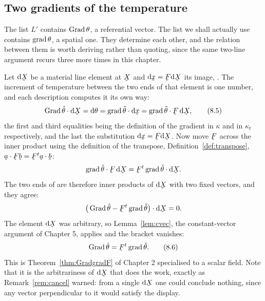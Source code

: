 \subsection*{Two gradients of the temperature}

The list $L'$ contains $\operatorname{Grad}\theta$, a referential vector. The list we
shall actually use contains $\operatorname{grad}\theta$, a spatial one. They determine
each other, and the relation between them is worth deriving rather than
quoting, since the same two-line argument recurs three more times in
this chapter.

Let $\dl\bX$ be a material line element at $\bX$ and $\dl\bx=\bF\dl\bX$
its image, . The increment of temperature between the two ends
of that element is one number, and each description computes it its own
way:
\begin{equation}
   \ip{\Grad\hat\theta}{\dl\bX}=\dl\theta
   =\ip{\grad\tilde\theta}{\dl\bx}
   =\ip{\grad\tilde\theta}{\bF\,\dl\bX},
   \tag{8.5}\label{eq:8.5}
\end{equation}
the first and third equalities being the definition of the gradient in
$\kappa$ and in $\kappa_{t}$ respectively, and the last the substitution
$\dl\bx=\bF\dl\bX$. Now move $\bF$ across the inner product using the
definition of the transpose, Definition~\ref{def:transpose},
$\ip\ba{\bF\bb}=\ip{\bF^{t}\ba}\bb$:
\[
   \ip{\grad\tilde\theta}{\bF\,\dl\bX}
   =\ip{\bF^{t}\grad\tilde\theta}{\dl\bX}.
\]
The two ends of  are therefore inner products of $\dl\bX$ with
two fixed vectors, and they agree:
\[
   \ip{\big(\Grad\hat\theta-\bF^{t}\grad\tilde\theta\big)}{\dl\bX}=0 .
\]
The element $\dl\bX$ was arbitrary, so Lemma~\ref{lem:cvec}, the
constant-vector argument of Chapter 5, applies and the bracket vanishes:
\begin{equation}
   \Grad\hat\theta=\bF^{t}\grad\tilde\theta .
   \tag{8.6}\label{eq:8.6}
\end{equation}
This is Theorem~\ref{thm:GradgradF} of Chapter 2 specialised to a scalar
field. Note that it is the arbitrariness of $\dl\bX$ that does the work,
exactly as Remark~\ref{rem:cancel} warned: from a single $\dl\bX$ one
could conclude nothing, since any vector perpendicular to it would
satisfy the display.

